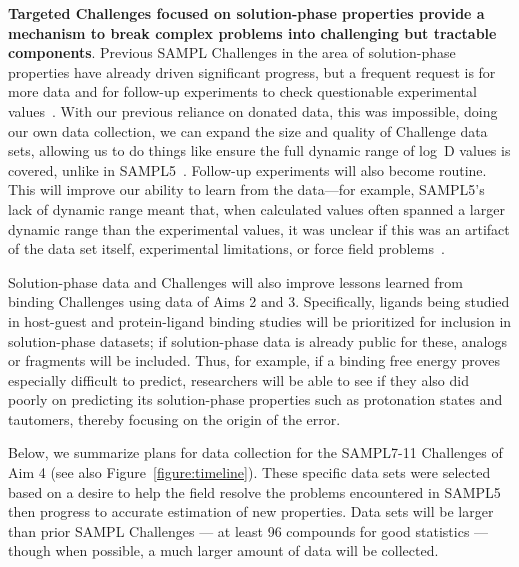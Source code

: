 \documentclass[11pt]{article}
\begin{document}
\textbf{Targeted Challenges focused on solution-phase properties provide a mechanism to break complex problems into challenging but tractable components}.  
Previous SAMPL Challenges in the area of solution-phase properties have already driven significant progress, but a frequent request is for more data and for follow-up experiments to check questionable experimental values~\cite{Mobley:2017:eScholarship}. 
With our previous reliance on donated data, this was impossible, doing our own data collection, we can expand the size and quality of Challenge data sets, allowing us to do things like ensure the full dynamic range of log~D values is covered, unlike in SAMPL5~\cite{rustenburg_measuring_2016, Bannan:2016:JComputAidedMolDes}. 
Follow-up experiments will also become routine. 
This will improve our ability to learn from the data---for example, SAMPL5's lack of dynamic range meant that, when calculated values often spanned a larger dynamic range than the experimental values, it was unclear if this was an artifact of the data set itself, experimental limitations, or force field problems~\cite{rustenburg_measuring_2016, Bannan:2016:JComputAidedMolDes, paranahewage_predicting_2016, klamt_prediction_2016}.  

Solution-phase data and Challenges will also improve lessons learned from binding Challenges using data of Aims 2 and 3.
Specifically, ligands being studied in host-guest and protein-ligand binding studies will be prioritized for inclusion in solution-phase datasets; if solution-phase data is already public for these, analogs or fragments will be included. 
Thus, for example, if a binding free energy proves especially difficult to predict, researchers will be able to see if they also did poorly on predicting its solution-phase properties such as protonation states and tautomers, thereby focusing on the origin of the error.

Below, we summarize plans for data collection for the SAMPL7-11 Challenges of Aim 4 (see also Figure~\ref{figure:timeline}).
These specific data sets were selected based on a desire to help the field resolve the problems encountered in SAMPL5 then progress to accurate estimation of new properties.
Data sets will be larger than prior SAMPL Challenges --- at least 96 compounds for good statistics ---  though when possible, a much larger amount of data will be collected.
\end{document}
